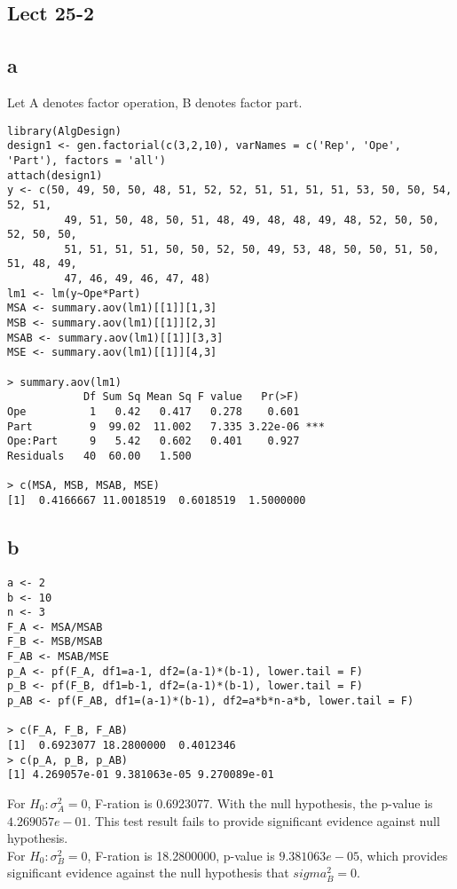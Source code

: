 \documentclass[11pt,letterpaper]{article}
\begin{document}
\subsection*{Lect 25-2}
\subsection*{a}
\noindent Let A denotes factor operation, B denotes factor part. 
\begin{verbatim}
library(AlgDesign)
design1 <- gen.factorial(c(3,2,10), varNames = c('Rep', 'Ope', 'Part'), factors = 'all')
attach(design1)
y <- c(50, 49, 50, 50, 48, 51, 52, 52, 51, 51, 51, 51, 53, 50, 50, 54, 52, 51,
         49, 51, 50, 48, 50, 51, 48, 49, 48, 48, 49, 48, 52, 50, 50, 52, 50, 50, 
         51, 51, 51, 51, 50, 50, 52, 50, 49, 53, 48, 50, 50, 51, 50, 51, 48, 49,
         47, 46, 49, 46, 47, 48)
lm1 <- lm(y~Ope*Part)
MSA <- summary.aov(lm1)[[1]][1,3]
MSB <- summary.aov(lm1)[[1]][2,3]
MSAB <- summary.aov(lm1)[[1]][3,3]
MSE <- summary.aov(lm1)[[1]][4,3]

> summary.aov(lm1)
            Df Sum Sq Mean Sq F value   Pr(>F)    
Ope          1   0.42   0.417   0.278    0.601    
Part         9  99.02  11.002   7.335 3.22e-06 ***
Ope:Part     9   5.42   0.602   0.401    0.927    
Residuals   40  60.00   1.500           

> c(MSA, MSB, MSAB, MSE)
[1]  0.4166667 11.0018519  0.6018519  1.5000000
\end{verbatim}

\subsection*{b}
\begin{verbatim}
a <- 2
b <- 10
n <- 3
F_A <- MSA/MSAB
F_B <- MSB/MSAB
F_AB <- MSAB/MSE
p_A <- pf(F_A, df1=a-1, df2=(a-1)*(b-1), lower.tail = F)
p_B <- pf(F_B, df1=b-1, df2=(a-1)*(b-1), lower.tail = F)
p_AB <- pf(F_AB, df1=(a-1)*(b-1), df2=a*b*n-a*b, lower.tail = F)

> c(F_A, F_B, F_AB)
[1]  0.6923077 18.2800000  0.4012346
> c(p_A, p_B, p_AB)
[1] 4.269057e-01 9.381063e-05 9.270089e-01
\end{verbatim}

\noindent For $H_0: \sigma_A^2 = 0$, F-ration is 0.6923077. With the null hypothesis, the p-value is $4.269057e-01$. This test result fails to provide significant evidence against null hypothesis. \\

\noindent For $H_0: \sigma_B^2 = 0$, F-ration is 18.2800000, p-value is $9.381063e-05$, which provides significant evidence against the null hypothesis that $sigma_B^2 = 0$. \\
\end{document}
